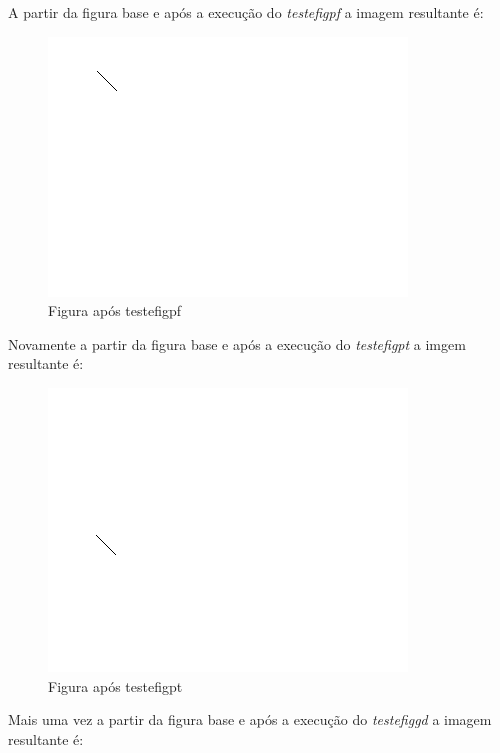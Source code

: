 \documentclass[12pt]{article}
\begin{document}
A partir da figura base e após a execução do \emph{testefigpf} a imagem resultante é:
\begin{figure}[H]
  \includegraphics[width=\linewidth]{02_depois_testefigpf.png}
  \caption{Figura após testefigpf}
\end{figure}

Novamente a partir da figura base e após a execução do \emph{testefigpt} a imgem resultante é:
\begin{figure}[H]
  \includegraphics[width=\linewidth]{03_depois_testefigpt.png}
  \caption{Figura após testefigpt}
\end{figure}

Mais uma vez a partir da figura base e após a execução do \emph{testefiggd} a imagem resultante é:
\end{document}
